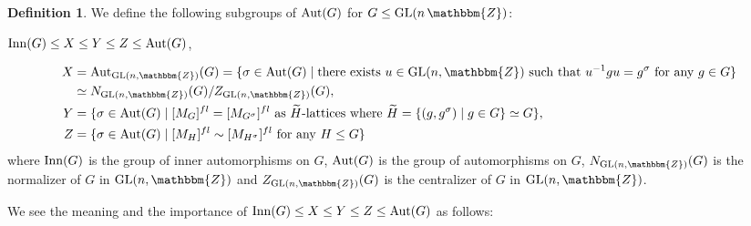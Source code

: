 \documentclass{amsart}
\theoremstyle{plain}
\theoremstyle{definition}
\newtheorem{definition}[theorem]{Definition}
\theoremstyle{remark}
\newcommand{\bZ}{\mathbbm{Z}}\newcommand{\bQ}{\mathbbm{Q}}
\newcommand{\GL}{{\rm GL}}\newcommand{\SL}{{\rm SL}}
\newcounter{sub}\def\tr{\mbox{tr }}
\begin{document}
\begin{definition}\label{defXYZ}
We define the following subgroups of ${\rm Aut}(G)$ for 
$G\leq {\rm GL}(n\,\bZ)$: 
\begin{center}
${\rm Inn}(G)\leq X\leq Y\leq Z\leq {\rm Aut}(G)$,
\end{center}
\begin{align*}
X&={\rm Aut}_{\GL(n,\bZ)}(G)=
\{\sigma\in{\rm Aut}(G)\mid 
{\rm there}\ {\rm exists}\ u\in {\rm GL}(n,\bZ)\ {\rm such}\ {\rm that}\ 
u^{-1}gu=g^\sigma\ {\rm for}\ {\rm any}\ g\in G\}\\
&\simeq N_{\GL(n,\bZ)}(G)/Z_{\GL(n,\bZ)}(G),\\
Y&=\{\sigma\in{\rm Aut}(G)\mid [M_G]^{fl}=[M_{G^\sigma}]^{fl}\ {\rm as}\ 
\widetilde{H}\textrm{-{\rm lattices}}\ {\rm where}\ \widetilde{H}=\{(g,g^\sigma)\mid g\in G\}\simeq G\},\\
Z&=\{\sigma\in{\rm Aut}(G)\mid [M_H]^{fl}\sim [M_{H^\sigma}]^{fl}\ {\rm for}\ {\rm any}\ H\leq G\} 
\end{align*}
where 
${\rm Inn}(G)$ is the group of inner automorphisms on $G$, 
${\rm Aut}(G)$ is the group of automorphisms on $G$, 
$N_{\GL(n,\bZ)}(G)$ is the normalizer of $G$ in $\GL(n,\bZ)$ and 
$Z_{\GL(n,\bZ)}(G)$ is the centralizer of $G$ in $\GL(n,\bZ)$.
%
%
\end{definition}
%
We see the meaning and the importance of %
${\rm Inn}(G)\leq X\leq Y\leq Z\leq {\rm Aut}(G)$ as follows: 
%
\end{document}
